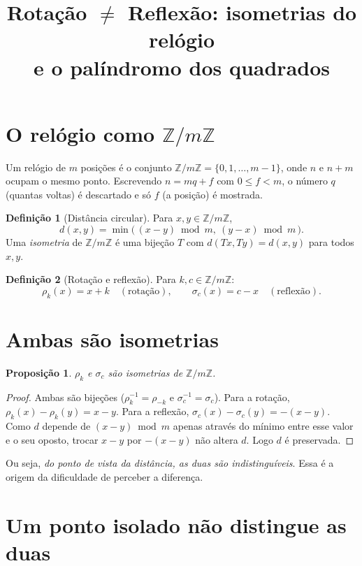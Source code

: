\documentclass[12pt,a4paper]{article}
\title{Rotação $\neq$ Reflexão: isometrias do relógio\\e o palíndromo dos quadrados}
\author{}
\date{}
\newtheorem{proposicao}{Proposição}
\theoremstyle{definition}
\newtheorem{definicao}{Definição}
\newcommand{\Zm}{\mathbb{Z}/m\mathbb{Z}}
\begin{document}
\maketitle

\section{O relógio como $\Zm$}

Um relógio de $m$ posições é o conjunto $\Zm=\{0,1,\dots,m-1\}$, onde $n$ e $n+m$ ocupam o mesmo ponto. Escrevendo $n=mq+f$ com $0\le f<m$, o número $q$ (quantas voltas) é descartado e só $f$ (a posição) é mostrada.

\begin{definicao}[Distância circular]
Para $x,y\in\Zm$,
\[
d(x,y)=\min\bigl(\,(x-y)\bmod m,\ (y-x)\bmod m\,\bigr).
\]
Uma \emph{isometria} de $\Zm$ é uma bijeção $T$ com $d(Tx,Ty)=d(x,y)$ para todos $x,y$.
\end{definicao}

\begin{definicao}[Rotação e reflexão]
Para $k,c\in\Zm$:
\[
\rho_k(x)=x+k \quad(\text{rotação}),\qquad \sigma_c(x)=c-x \quad(\text{reflexão}).
\]
\end{definicao}

\section{Ambas são isometrias}

\begin{proposicao}
$\rho_k$ e $\sigma_c$ são isometrias de $\Zm$.
\end{proposicao}

\begin{proof}
Ambas são bijeções ($\rho_k^{-1}=\rho_{-k}$ e $\sigma_c^{-1}=\sigma_c$). Para a rotação, $\rho_k(x)-\rho_k(y)=x-y$. Para a reflexão, $\sigma_c(x)-\sigma_c(y)=-(x-y)$. Como $d$ depende de $(x-y)\bmod m$ apenas através do mínimo entre esse valor e o seu oposto, trocar $x-y$ por $-(x-y)$ não altera $d$. Logo $d$ é preservada.
\end{proof}

Ou seja, \emph{do ponto de vista da distância, as duas são indistinguíveis}. Essa é a origem da dificuldade de perceber a diferença.

\section{Um ponto isolado não distingue as duas}
\end{document}
